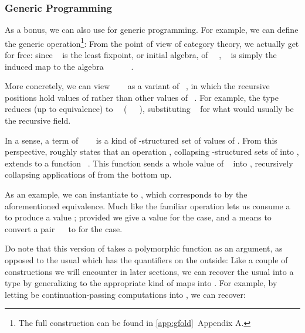 \subsubsection{Generic Programming}\label{ssec:generic-programming}
As a bonus, we can also use  for generic programming. For example, we can define the generic  operation\footnote{The full construction can be found in \ref{app:gfold}~Appendix A.}:
From the point of view of category theory, we actually get  for free: since \  is the least fixpoint, or initial algebra, of \ \ , \  is simply the induced map to the algebra \ \ \ \ \ \ .

More concretely, we can view \ \ \  as a variant of \ , in which the recursive positions hold values of  rather than other values of \ . For example, the type \ \ \  reduces (up to equivalence) to \ \ (\ \ \ ), substituting \  for what would usually be the recursive field.

In a sense, a term of \ \ \  is a kind of -structured set of values of . From this perspective,  roughly states that an operation , collapsing -structured sets of  into , extends to a function \ . This function sends a whole value of \  into , recursively collapsing applications of  from the bottom up.

As an example, we can instantiate  to , which corresponds to
by the aforementioned equivalence. Much like the familiar  operation lets us consume a \  to produce a value ; provided we give a value  for the \AIC{[]} case, and a means to convert a pair \ \  to  for the  case.

Do note that this version of  takes a polymorphic function as an argument, as opposed to the usual  which has the quantifiers on the outside:
Like a couple of constructions we will encounter in later sections, we can recover the usual  into a type  by generalizing  to the appropriate kind of maps into . For example, by letting  be continuation-passing computations into \bN{}, we can recover:


